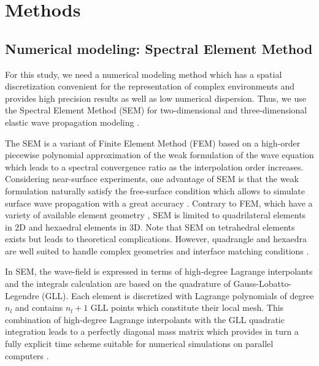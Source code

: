 \documentclass[manuscript,revised]{geophysics}
\begin{document}
\section{Methods}

\subsection{Numerical modeling: Spectral Element Method}

\noindent For this study, we need a numerical modeling method which has a spatial discretization convenient for the representation of complex environments and provides high precision results as well as low numerical dispersion. Thus, we use the Spectral Element Method (SEM) for two-dimensional and three-dimensional elastic wave propagation modeling \citep{Komatitsch_SEM_1998,Komatitsch_ISM_1999,Komatitsch_SEM_2005,Festa_PML_2005}. 

\noindent The SEM is a variant of Finite Element Method (FEM) \citep{Lysmer_FEM_1972,Seron_FEM_1990,Hulbert_FEM_1990,Tromp_SEM_2008} based on a high-order piecewise polynomial approximation of the weak formulation of the wave equation which leads to a spectral convergence ratio as the interpolation order increases. Considering near-surface experiments, one advantage of SEM is that the weak formulation naturally satisfy the free-surface condition which allows to simulate surface wave propagation with a great accuracy \citep{komatitsch1998spectral,komatitsch1999spectral,Komatitsch_SEM_2005}. Contrary to FEM, which have a variety of available element geometry \citep{dhatt1984finite}, SEM is limited to quadrilateral elements in 2D and hexaedral elements in 3D. Note that SEM on tetrahedral elements exists \citep{komatitsch2001wave} but leads to theoretical complications. However, quadrangle and hexaedra are well suited to handle complex geometries and interface matching conditions \citep{Cristini_SEM_2012}. 

\noindent In SEM, the wave-field is expressed in terms of high-degree Lagrange interpolants and the integrals calculation are based on the quadrature of Gauss-Lobatto-Legendre (GLL). Each element is discretized with Lagrange polynomials of degree $n_{l}$ and contains $n_{l}+1$ GLL points which constitute their local mesh. This combination of high-degree Lagrange interpolants with the GLL quadratic integration leads to a perfectly diagonal mass matrix which provides in turn a fully explicit time scheme suitable for numerical simulations on parallel computers \citep{komatitsch1998spectral,komatitsch1999spectral}.
\end{document}
